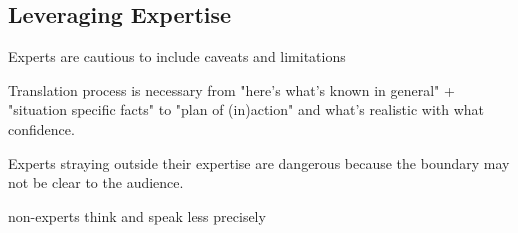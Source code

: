 \subsection{Leveraging Expertise}

Experts are cautious to include caveats and limitations

Translation process is necessary from "here's what's known in general" + "situation specific facts" to "plan of (in)action" and what's realistic with what confidence. 

Experts straying outside their expertise are dangerous because the boundary may not be clear to the audience.

non-experts think and speak less precisely

